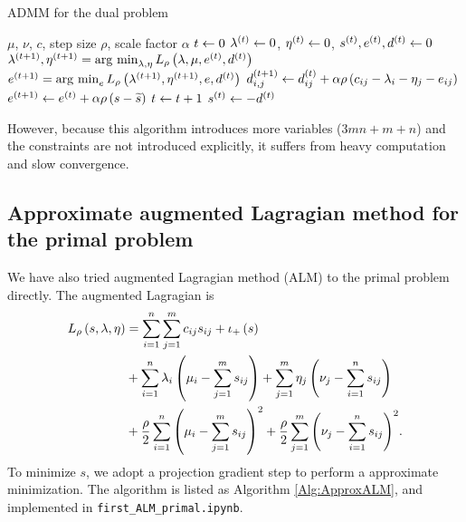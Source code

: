 \documentclass[english]{pkupaper}
\begin{document}
\begin{algorithm}
\caption{ADMM for the dual problem}
\label{Alg:ADMMDual}
\begin{algorithmic}
\REQUIRE $\mu$, $\nu$, $c$, step size $\rho$, scale factor $\alpha$
\STATE $ t \leftarrow 0 $
\STATE $ \lambda^{\left( t \right)} \leftarrow 0 $, $ \eta^{\left( t \right)} \leftarrow 0 $, $ s^{\left( t \right)}, e^{\left( t \right)}, d^{\left( t \right)} \leftarrow 0 $
\STATE $ \lambda^{\left(  t + 1  \right)}, \eta^{\left(  t + 1  \right)} = \operatorname*{\arg\,\min}_{ \lambda, \eta } L_{\rho} \left(  \lambda, \mu, e^{\left( t \right)}, d^{\left( t \right)}  \right) $
\STATE $ e^{\left(  t + 1  \right)} = \operatorname*{\arg\,\min}_e L_{\rho} \left(  \lambda^{\left(  t + 1  \right)}, \eta^{\left(  t + 1  \right)}, e, d^{\left( t \right)}  \right) $
\STATE $ d^{\left(  t + 1  \right)}_{ i, j } \leftarrow d^{\left( t \right)}_{ i j } + \alpha \rho \left(  c_{ i j } - \lambda_i - \eta_j - e_{ i j }  \right) $
\STATE $ e^{\left(  t + 1  \right)} \leftarrow e^{\left( t \right)} + \alpha \rho \left(  s - \widetilde{s}  \right) $
\STATE $ t \leftarrow t + 1 $
\ENDWHILE
\STATE $ s^{\left( t \right)} \leftarrow -d^{\left( t \right)} $
\end{algorithmic}
\end{algorithm}

However, because this algorithm introduces more variables ($ 3 m n + m + n $) and the constraints are not introduced explicitly, it suffers from heavy computation and slow convergence.

\subsection{Approximate augmented Lagragian method for the primal problem}

We have also tried augmented Lagragian method (ALM) to the primal problem directly. The augmented Lagragian is
\begin{equation}
\begin{aligned}
L_{\rho} \left(  s, \lambda, \eta  \right) &= \sum_{ {i} = {1} }^{n}{\sum_{ {j} = {1} }^{m}{ c_{ i j } s_{ i j } }} + \iota_+ \left( s \right) \\
&+ \sum_{ {i} = {1} }^{n}{ \lambda_i \left(  \mu_i - \sum_{ {j} = {1} }^{m}{s_{ i j }}  \right) } + \sum_{ {j} = {1} }^{m}{ \eta_j \left(  \nu_j - \sum_{ {i} = {1} }^{n}{s_{ i j }}  \right) } \\
&+ \frac{\rho}{2} \sum_{ {i} = {1} }^{n}{\left(  \mu_i - \sum_{ {j} = {1} }^{m}{s_{ i j }}  \right)^2} + \frac{\rho}{2} \sum_{ {j} = {1} }^{m}{\left(  \nu_j - \sum_{ {i} = {1} }^{n}{s_{ i j }}  \right)^2}. \\
\end{aligned}
\end{equation}
To minimize $s$, we adopt a projection gradient step to perform a approximate minimization. The algorithm is listed as Algorithm \ref{Alg:ApproxALM}, and implemented in \verb"first_ALM_primal.ipynb".
\end{document}

